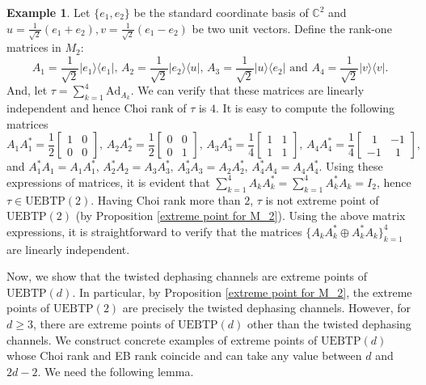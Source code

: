 \documentclass[11pt,reqno]{amsart}
\theoremstyle{definition}
\newtheorem{eg}[defn]{Example}
\theoremstyle{plain}
\theoremstyle{remark}
\newcommand{\la}{\langle}
\newcommand{\ra}{\rangle}
\numberwithin{equation}{section}%
\begin{document}
\begin{eg}\label{EMD:eg5}
	Let $\{e_1,e_2\}$ be the standard coordinate basis of $\mathbb{C}^2$ and $u=\frac{1}{\sqrt{2}}(e_1+e_2), v=\frac{1}{\sqrt{2}}(e_1-e_2)$ be two unit vectors. Define the rank-one matrices in $M_2$:
	\[A_1=\frac{1}{\sqrt{2}}|e_1\ra\la e_1|,\, A_2=\frac{1}{\sqrt{2}}|e_2\ra\la u|,\, A_3=\frac{1}{\sqrt{2}}|u\ra\la e_2|\text{ and }A_4=\frac{1}{\sqrt{2}}|v\ra\la v|.\]
	And, let $\tau=\sum_{k=1}^4\text{Ad}_{A_k}$. We can verify that these matrices are linearly independent and hence Choi rank of $\tau$ is $4$. It is easy to compute the following matrices
	\[A_1A_1^*=\frac{1}{2}\begin{bmatrix}
		1 & 0\\0& 0 
	\end{bmatrix},\, A_2A_2^*=\frac{1}{2}\begin{bmatrix}
		0 & 0\\0& 1 
	\end{bmatrix},\, A_3A_3^*=\frac{1}{4}\begin{bmatrix}
		1 & 1\\1& 1
	\end{bmatrix},\, A_4A_4^*=\frac{1}{4}\begin{bmatrix}
		\ \  1 & -1\\-1& \ \ 1
	\end{bmatrix},\]
	and $A_1^*A_1=A_1A_1^*,\, A_2^*A_2=A_3A_3^*,\, A_3^*A_3=A_2A_2^*,\, A_4^*A_4=A_4A_4^*$. Using these expressions of matrices, it is evident that $\sum_{k=1}^4A_kA_k^*=\sum_{k=1}^4 A_k^*A_k=I_2$, hence $\tau\in\mathrm{UEBTP}(2)$. Having Choi rank more than $2$, $\tau$ is not extreme point of $\mathrm{UEBTP}(2)$ (by Proposition \ref{extreme point for M_2}). Using the above matrix expressions, it is straightforward to verify that the matrices $\{A_kA_k^*\oplus A_k^*A_k\}_{k=1}^4$ are linearly independent. 
\end{eg}




Now, we show that the twisted dephasing channels are extreme points of $\mathrm{UEBTP}(d)$. In particular, by Proposition \ref{extreme point for M_2}, the extreme points of $\mathrm{UEBTP}(2)$ are precisely the twisted dephasing channels. However, for $d\geq 3$, there are extreme points of $\mathrm{UEBTP}(d)$ other than the twisted dephasing channels. We construct concrete examples of extreme points of $\mathrm{UEBTP}(d)$ whose Choi rank and EB rank coincide and can take any value between $d$ and $2d-2$. We need the following lemma.
\end{document}
